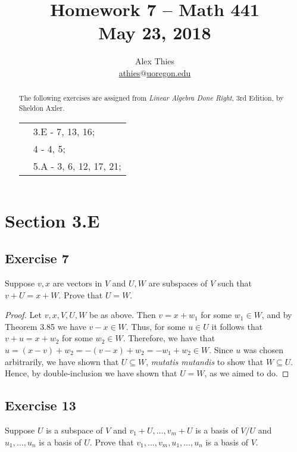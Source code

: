 \documentclass[letterpaper, 12pt]{amsart}
\theoremstyle{definition}  							%
\begin{document}
	\title{Homework 7  -- Math 441 \\ M\lowercase{ay 23, 2018}}
	\author{Alex Thies \\ \href{mailto:athies@uoregon.edu}{\lowercase{athies$@$uoregon.edu}}}

	\begin{abstract}
	The following exercises are assigned from \textit{Linear Algebra Done Right}, 3rd Edition, by Sheldon Axler. 
			\begin{tabular}{rl}
				& 3.E - 7, 13, 16; \\
				& 4 - 4, 5; \\
				& 5.A - 3, 6, 12, 17, 21;
			\end{tabular}
	\end{abstract}

	\maketitle

	\section*{Section 3.E}
		\subsection*{Exercise 7}
		Suppose $v, x$ are vectors in $V$ and $U, W$ are subspaces of $V$ such that $v + U = x + W$. 
		Prove that $U = W$.

		\begin{proof}
		Let $v, x, V, U, W$ be as above.
		Then $v = x + w_{1}$ for some $w_{1} \in W$, and by Theorem 3.85 we have $v - x \in W$.
		Thus, for some $u \in U$ it follows that $v + u = x + w_{2}$ for some $w_{2} \in W$.
		Therefore, we have that $u = (x-v) + w_{2} = -(v-x) + w_{2} = -w_{1}+w_{2} \in W$.
		Since $u$ was chosen arbitrarily, we have shown that $U \subseteq W$, \textit{mutatis mutandis} to show that $W \subseteq U$.
		Hence, by double-inclusion we have shown that $U = W$, as we aimed to do.
		\end{proof}

		\subsection*{Exercise 13}
		Suppose $U$ is a subspace of $V$ and $v_{1} + U, \dots, v_{m} + U$ is a basis of $V/U$ and $u_{1}, \dots, u_{n}$ is a basis of $U$. 
		Prove that $v_{1}, \dots, v_{m},u_{1}, \dots, u_{n}$ is a basis of $V$.
\end{document}

